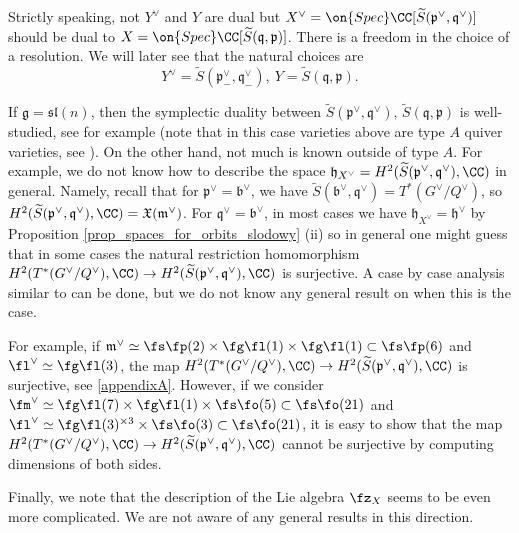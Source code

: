 \documentclass[12pt]{amsart}
\begin{document}
\begin{warning}
Strictly speaking,  not $Y^\vee$ and $Y$ are  dual but $X^\vee=\on{Spec}\CC[\widetilde{S}(\mathfrak{p}^\vee,\mathfrak{q}^\vee)]$ should be dual to $X=\on{Spec}\CC[\widetilde{S}(\mathfrak{q},\mathfrak{p})]$.    There is a freedom in the choice of a resolution. We will later see that the natural choices are 
\begin{equation*}
Y^\vee = \widetilde{S}(\mathfrak{p}^\vee_-,\mathfrak{q}^{\vee}_-),~Y=\widetilde{S}(\mathfrak{q},\mathfrak{p}).
\end{equation*}
\end{warning}
  

    
\begin{rmk}
If $\mathfrak{g}=\mathfrak{sl}(n)$, then the symplectic duality between $\widetilde{S}(\mathfrak{p}^\vee,\mathfrak{q}^\vee),\, \widetilde{S}(\mathfrak{q},\mathfrak{p})$ is well-studied, see for example \cite[Section 10.2.2]{BPWII} (note that in this case varieties above are type $A$ quiver varieties, see \cite{maffei}). On the other hand, not much is known outside of type $A$. For example, we do not know how to describe the space $\mathfrak{h}_{X^\vee}=H^2(\widetilde{S}(\mathfrak{p}^\vee,\mathfrak{q}^\vee),\CC)$ in general. Namely, recall that for $\mathfrak{p}^\vee=\mathfrak{b}^\vee$, we have $\widetilde{S}(\mathfrak{b}^\vee,\mathfrak{q}^\vee)=T^*(G^\vee/Q^\vee)$, so $H^2(\widetilde{S}(\mathfrak{p}^\vee,\mathfrak{q}^\vee),\CC)=\mathfrak{X}(\mathfrak{m}^\vee)$. For $\mathfrak{q}^\vee=\mathfrak{b}^\vee$, in most cases we have $\mathfrak{h}_{X^\vee}=\mathfrak{h}^\vee$ by Proposition \ref{prop_spaces_for_orbits_slodowy} (ii) so in general one might guess that in some cases the natural restriction homomorphism $H^2(T^*(G^\vee/Q^\vee),\CC) \rightarrow H^2(\widetilde{S}(\mathfrak{p}^\vee,\mathfrak{q}^\vee),\CC)$ is surjective. A case by case analysis similar to \cite{LehnNamikawaSorger} can be done, but we do not know any general result on when this is the case. 

For example, if $\mathfrak{m}^\vee\simeq \fs\fp(2)\times \fg\fl(1)\times \fg\fl(1)\subset \fs\fp(6)$ and $\fl^\vee\simeq \fg\fl(3)$, the map $H^2(T^*(G^\vee/Q^\vee),\CC) \rightarrow H^2(\widetilde{S}(\mathfrak{p}^\vee,\mathfrak{q}^\vee),\CC)$ is surjective, see \cref{appendixA}. However, if we consider $\fm^\vee\simeq \fg\fl(7)\times \fg\fl(1)\times \fs\fo(5)\subset \fs\fo(21)$ and $\fl^\vee\simeq \fg\fl(3)^{\times 3}\times \fs\fo(3)\subset \fs\fo(21)$, it is easy to show that the map $H^2(T^*(G^\vee/Q^\vee),\CC) \rightarrow H^2(\widetilde{S}(\mathfrak{p}^\vee,\mathfrak{q}^\vee),\CC)$ cannot be surjective by computing dimensions of both sides.

Finally, we note that the description of the Lie algebra $\fz_X$ seems to be even more complicated. We are not aware of any general results in this direction.
\end{rmk}
    
\end{document}
